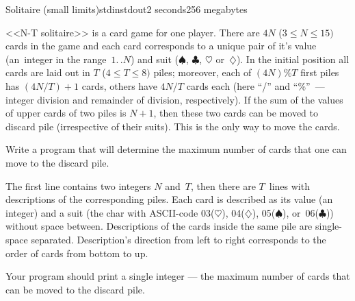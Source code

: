 \begin{problem}{Solitaire (small limits)}{stdin}{stdout}{2 seconds}{256 megabytes}

<<N-T solitaire>> is a card game for one player. There are $4N$ 
($3\leq N\leq 15)$ cards in the game and each card corresponds to a unique pair of it's value (an~integer in the range~$1.\,.N$) and suit ($\spadesuit$, $\clubsuit$, $\heartsuit$ or~$\diamondsuit$). In the initial position all cards are laid out in $T$ ($4\leq T\leq 8)$ piles; moreover, each of $(4N)\%T$ first piles has $(4N/T)+1$ cards, others have $4N/T$ cards each (here ``/'' and ``\%''~--- integer division and remainder of division, respectively). If the sum of the values of upper cards of two piles is $N+1$, then these two cards can be moved to discard pile (irrespective of their suits). This is the only way to move the cards.

Write a program that will determine the maximum number of cards that one can move to the discard pile.

\InputFile
The first line contains two integers $N$ and~$T$, then there are $T$~lines with descriptions of the corresponding piles. Each card is described as its value (an integer) and a suit (the char with ASCII-code 03($\heartsuit$), 04($\diamondsuit$), 05($\spadesuit$), or~06($\clubsuit$)) without space between. Descriptions of the cards inside the same pile are single-space separated. Description's direction from left to right corresponds to the order of cards from bottom to up.

\OutputFile
Your program should print a single integer --- the maximum number of cards that can be moved to the discard pile.

\Examples

\begin{example}
%
\end{example}

\end{problem}
